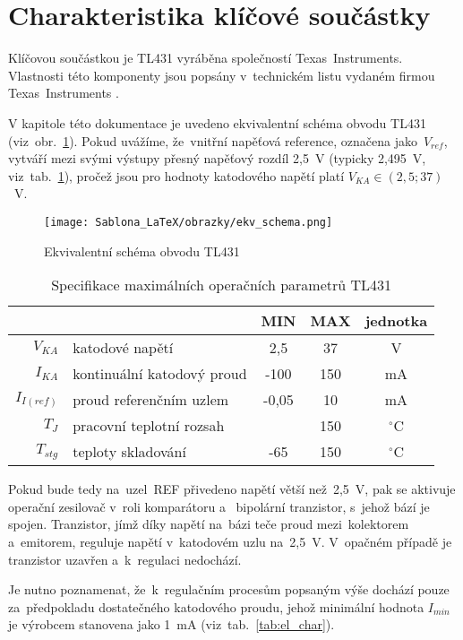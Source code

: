 \documentclass[12pt]{CLASS/protokol}
\begin{document}
\clearpage
\newpage
\section{Charakteristika klíčové součástky}\label{sec:char_soucastky}
    Klíčovou součástkou je TL431 vyráběna společností Texas~Instruments. Vlastnosti této komponenty jsou popsány v~technickém listu vydaném firmou Texas~Instruments \cite{TI_TL431_datasheet}.
    \par
    V kapitole  této dokumentace je uvedeno ekvivalentní schéma obvodu TL431 (viz~obr.~\ref{fig:ekv_schematic}). Pokud uvážíme, že~vnitřní napěťová reference, označena jako~$V_{ref}$, vytváří mezi svými výstupy přesný napěťový rozdíl 2,5~V (typicky 2,495~V, viz~tab.~\ref{tab:max_ratings}), pročež jsou pro hodnoty katodového napětí platí $V_{KA} \in (2,5;37)$~V.

    \begin{figure}[h]
        \centering
        \texttt{[image: Sablona\_LaTeX/obrazky/ekv\_schema.png]}
        \caption{Ekvivalentní schéma obvodu TL431\cite{TI_TL431_datasheet}}
        \label{fig:ekv_schematic}
    \end{figure}

    \begin{table}[h]
    \centering
    \caption{Specifikace maximálních operačních parametrů TL431}
    \label{tab:max_ratings}
    \begin{tabular}{rlccc}
    \textbf{}                                   & \textbf{}                  & MIN   & MAX & jednotka  \\ \hline
    \multicolumn{1}{r}{\textbf{$V_{KA}$}}     & katodové napětí            & 2,5   & 37  & V         \\
    \multicolumn{1}{r}{\textbf{$I_{KA}$}}     & kontinuální katodový proud & -100  & 150 & mA        \\
    \multicolumn{1}{r}{\textbf{$I_{I(ref)}$}} & proud referenčním uzlem    & -0,05 & 10  & mA        \\
    \multicolumn{1}{r}{\textbf{$T_J$}}          & pracovní teplotní rozsah   &       & 150 & $^\circ$C \\
    \multicolumn{1}{r}{\textbf{$T_{stg}$}}    & teploty skladování         & -65   & 150 & $^\circ$C
    \end{tabular}
    \end{table}
    
    \par
    Pokud bude tedy na~uzel~REF přivedeno napětí větší než~2,5~V, pak se aktivuje operační zesilovač v~roli komparátoru a~ bipolární tranzistor, s~jehož bází je spojen. Tranzistor, jímž díky napětí na~bázi teče proud mezi~kolektorem a~emitorem, reguluje napětí v~katodovém uzlu na~2,5~V. V~opačném případě je tranzistor uzavřen a~k~regulaci nedochází.
    \par
    Je nutno poznamenat, že~k~regulačním procesům popsaným výše dochází pouze za~předpokladu dostatečného katodového proudu, jehož minimální hodnota $I_{min}$ je výrobcem stanovena jako 1~mA (viz~tab.~\ref{tab:el_char}).
\end{document}
